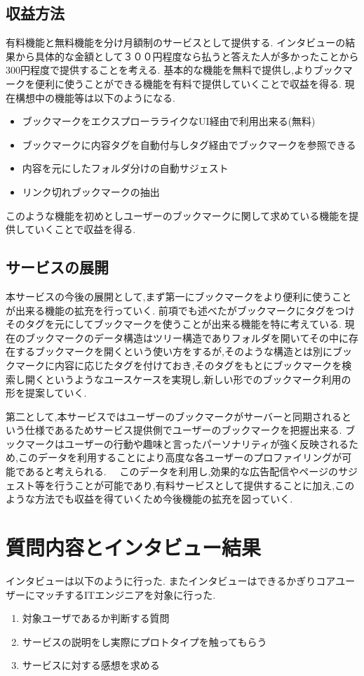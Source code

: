 \documentclass[a4paper,10pt,fleqn]{jsarticle}
\begin{document}
\subsection{収益方法}
有料機能と無料機能を分け月額制のサービスとして提供する.
インタビューの結果から具体的な金額として３００円程度なら払うと答えた人が多かったことから300円程度で提供することを考える.
基本的な機能を無料で提供し,よりブックマークを便利に使うことができる機能を有料で提供していくことで収益を得る.
現在構想中の機能等は以下のようになる.
\begin{itemize}
  \item ブックマークをエクスプローラライクなUI経由で利用出来る(無料)
  \item ブックマークに内容タグを自動付与しタグ経由でブックマークを参照できる
  \item 内容を元にしたフォルダ分けの自動サジェスト
  \item リンク切れブックマークの抽出
\end{itemize}
このような機能を初めとしユーザーのブックマークに関して求めている機能を提供していくことで収益を得る.

\subsection{サービスの展開}
本サービスの今後の展開として,まず第一にブックマークをより便利に使うことが出来る機能の拡充を行っていく.
前項でも述べたがブックマークにタグをつけそのタグを元にしてブックマークを使うことが出来る機能を特に考えている.
現在のブックマークのデータ構造はツリー構造でありフォルダを開いてその中に存在するブックマークを開くという使い方をするが,そのような構造とは別にブックマークに内容に応じたタグを付けておき,そのタグをもとにブックマークを検索し開くというようなユースケースを実現し,新しい形でのブックマーク利用の形を提案していく.
\par
第二として,本サービスではユーザーのブックマークがサーバーと同期されるという仕様であるためサービス提供側でユーザーのブックマークを把握出来る. ブックマークはユーザーの行動や趣味と言ったパーソナリティが強く反映されるため,このデータを利用することにより高度な各ユーザーのプロファイリングが可能であると考えられる. 　このデータを利用し,効果的な広告配信やページのサジェスト等を行うことが可能であり,有料サービスとして提供することに加え,このような方法でも収益を得ていくため今後機能の拡充を図っていく.

\section{質問内容とインタビュー結果}
インタビューは以下のように行った. またインタビューはできるかぎりコアユーザーにマッチするITエンジニアを対象に行った.
\begin{enumerate}
  \item 対象ユーザであるか判断する質問
  \item サービスの説明をし実際にプロトタイプを触ってもらう
  \item サービスに対する感想を求める
\end{enumerate}
\end{document}
